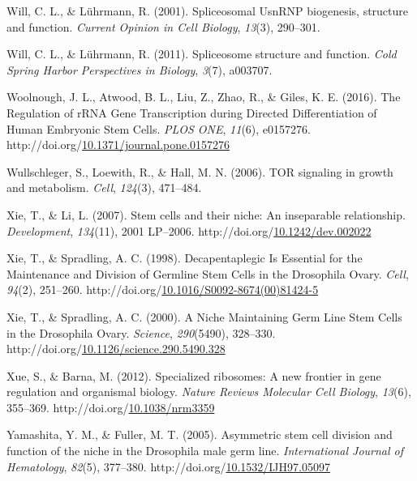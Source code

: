 \documentclass[12pt,oneside]{reedthesis}
\newlength{\cslhangindent}
\newenvironment{CSLReferences}[2] %
 {%
  \setlength{\parindent}{0pt}
  \ifodd #1 \everypar{\setlength{\hangindent}{\cslhangindent}}\ignorespaces\fi
  \ifnum #2 > 0
  \setlength{\parskip}{#2\baselineskip}
  \fi
 }%
 {}
\begin{document}
\begin{CSLReferences}{1}{0}
\leavevmode{}%
Will, C. L., \& Lührmann, R. (2001). Spliceosomal {UsnRNP} biogenesis, structure and function. \emph{Current Opinion in Cell Biology}, \emph{13}(3), 290--301.

\leavevmode{}%
Will, C. L., \& Lührmann, R. (2011). Spliceosome structure and function. \emph{Cold Spring Harbor Perspectives in Biology}, \emph{3}(7), a003707.

\leavevmode{}%
Woolnough, J. L., Atwood, B. L., Liu, Z., Zhao, R., \& Giles, K. E. (2016). The {Regulation} of {rRNA Gene Transcription} during {Directed Differentiation} of {Human Embryonic Stem Cells}. \emph{PLOS ONE}, \emph{11}(6), e0157276. http://doi.org/\href{https://doi.org/10.1371/journal.pone.0157276}{10.1371/journal.pone.0157276}

\leavevmode{}%
Wullschleger, S., Loewith, R., \& Hall, M. N. (2006). {TOR} signaling in growth and metabolism. \emph{Cell}, \emph{124}(3), 471--484.

\leavevmode{}%
Xie, T., \& Li, L. (2007). Stem cells and their niche: An inseparable relationship. \emph{Development}, \emph{134}(11), 2001 LP--2006. http://doi.org/\href{https://doi.org/10.1242/dev.002022}{10.1242/dev.002022}

\leavevmode{}%
Xie, T., \& Spradling, A. C. (1998). Decapentaplegic {Is Essential} for the {Maintenance} and {Division} of {Germline Stem Cells} in the {Drosophila Ovary}. \emph{Cell}, \emph{94}(2), 251--260. http://doi.org/\href{https://doi.org/10.1016/S0092-8674(00)81424-5}{10.1016/S0092-8674(00)81424-5}

\leavevmode{}%
Xie, T., \& Spradling, A. C. (2000). A {Niche Maintaining Germ Line Stem Cells} in the {Drosophila Ovary}. \emph{Science}, \emph{290}(5490), 328--330. http://doi.org/\href{https://doi.org/10.1126/science.290.5490.328}{10.1126/science.290.5490.328}

\leavevmode{}%
Xue, S., \& Barna, M. (2012). Specialized ribosomes: A new frontier in gene regulation and organismal biology. \emph{Nature Reviews Molecular Cell Biology}, \emph{13}(6), 355--369. http://doi.org/\href{https://doi.org/10.1038/nrm3359}{10.1038/nrm3359}

\leavevmode{}%
Yamashita, Y. M., \& Fuller, M. T. (2005). Asymmetric stem cell division and function of the niche in the {Drosophila} male germ line. \emph{International Journal of Hematology}, \emph{82}(5), 377--380. http://doi.org/\href{https://doi.org/10.1532/IJH97.05097}{10.1532/IJH97.05097}


\end{CSLReferences}
\end{document}
